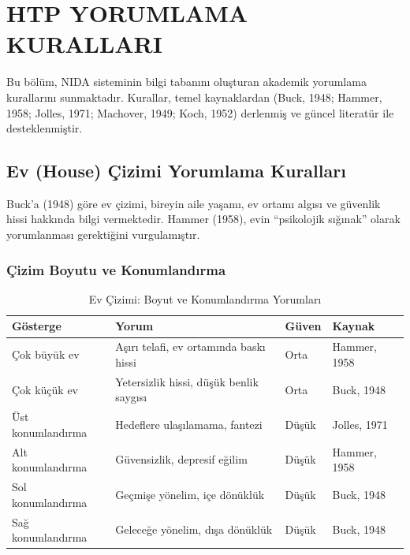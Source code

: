 
\chapter{HTP YORUMLAMA KURALLARI}

Bu bölüm, NIDA sisteminin bilgi tabanını oluşturan akademik yorumlama kurallarını sunmaktadır. Kurallar, temel kaynaklardan (Buck, 1948; Hammer, 1958; Jolles, 1971; Machover, 1949; Koch, 1952) derlenmiş ve güncel literatür ile desteklenmiştir.

\section{Ev (House) Çizimi Yorumlama Kuralları}

Buck'a (1948) göre ev çizimi, bireyin aile yaşamı, ev ortamı algısı ve güvenlik hissi hakkında bilgi vermektedir. Hammer (1958), evin ``psikolojik sığınak'' olarak yorumlanması gerektiğini vurgulamıştır.

\subsection{Çizim Boyutu ve Konumlandırma}

\begin{table}[H]
\centering
\caption{Ev Çizimi: Boyut ve Konumlandırma Yorumları}
\label{tab:evboyut}
\begin{tabular}{p{3.5cm}p{5cm}p{2.5cm}p{2.5cm}}
\toprule
\textbf{Gösterge} & \textbf{Yorum} & \textbf{Güven} & \textbf{Kaynak} \\
\midrule
Çok büyük ev & Aşırı telafi, ev ortamında baskı hissi & Orta & Hammer, 1958 \\
Çok küçük ev & Yetersizlik hissi, düşük benlik saygısı & Orta & Buck, 1948 \\
Üst konumlandırma & Hedeflere ulaşılamama, fantezi & Düşük & Jolles, 1971 \\
Alt konumlandırma & Güvensizlik, depresif eğilim & Düşük & Hammer, 1958 \\
Sol konumlandırma & Geçmişe yönelim, içe dönüklük & Düşük & Buck, 1948 \\
Sağ konumlandırma & Geleceğe yönelim, dışa dönüklük & Düşük & Buck, 1948 \\
\bottomrule
\end{tabular}
\end{table}

